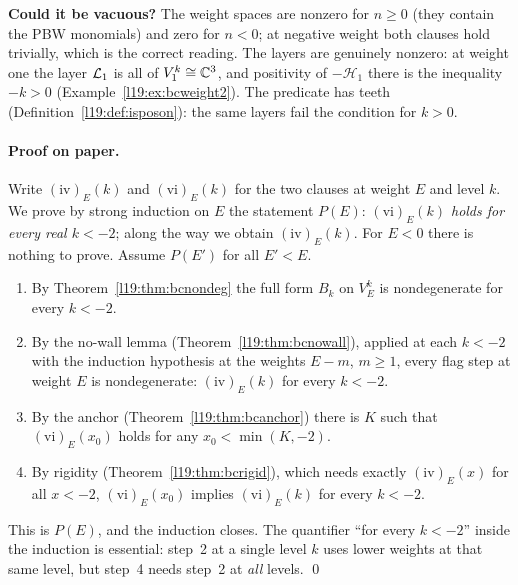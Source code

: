 \begin{dictionary}
\textbf{Could it be vacuous?} The weight spaces are nonzero for $n\ge0$ (they contain the PBW monomials) and
zero for $n<0$; at negative weight both clauses hold trivially, which is the correct reading. The layers are
genuinely nonzero: at weight one the layer $\mathcal{L}_1$ is all of $V^k_1\cong{\mathbb{C}}^3$, and positivity of
$-\mathcal H_1$ there is the inequality $-k>0$ (Example~\ref{l19:ex:bcweight2}). The predicate  has teeth
(Definition~\ref{l19:def:isposon}): the same layers fail the condition for $k>0$.
\end{dictionary}

\paragraph{Proof on paper.} Write $\mathrm{(iv)}_E(k)$ and $\mathrm{(vi)}_E(k)$ for the two clauses at weight
$E$ and level $k$. We prove by strong induction on $E$ the statement $P(E)$: \emph{$\mathrm{(vi)}_E(k)$ holds for
every real $k<-2$}; along the way we obtain $\mathrm{(iv)}_E(k)$. For $E<0$ there is nothing to prove.
Assume $P(E')$ for all $E'<E$.
\begin{enumerate}
\item By Theorem~\ref{l19:thm:bcnondeg} the full form $B_k$ on $V^k_E$ is nondegenerate for every $k<-2$.
\item By the no-wall lemma (Theorem~\ref{l19:thm:bcnowall}), applied at each $k<-2$ with the induction hypothesis
  at the weights $E-m$, $m\ge1$, every flag step at weight $E$ is nondegenerate: $\mathrm{(iv)}_E(k)$ for every
  $k<-2$.
\item By the anchor (Theorem~\ref{l19:thm:bcanchor}) there is $K$ such that $\mathrm{(vi)}_E(x_0)$ holds for any
  $x_0<\min(K,-2)$.
\item By rigidity (Theorem~\ref{l19:thm:bcrigid}), which needs exactly $\mathrm{(iv)}_E(x)$ for all $x<-2$,
  $\mathrm{(vi)}_E(x_0)$ implies $\mathrm{(vi)}_E(k)$ for every $k<-2$.
\end{enumerate}
This is $P(E)$, and the induction closes. The quantifier ``for every $k<-2$'' inside the induction is essential:
step~2 at a single level $k$ uses lower weights at that same level, but step~4 needs step~2 at \emph{all} levels.
\qed

